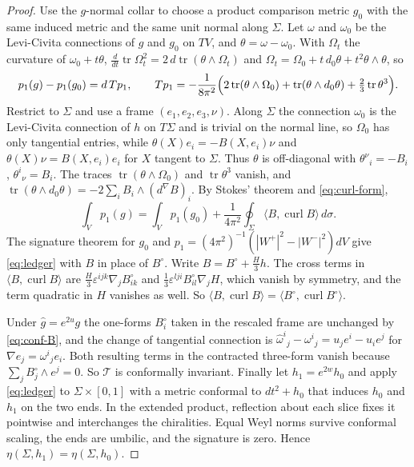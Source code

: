 \documentclass[11pt,letterpaper]{article}
\numberwithin{equation}{section}
\theoremstyle{definition}
\DeclareMathOperator{\tr}{tr}
\DeclareMathOperator{\curl}{curl}
\newcommand{\cT}{\mathcal T}
\begin{document}
\begin{proof}
Use the \(g\)-normal collar to choose a product comparison metric
\(g_0\) with the same induced metric and the same unit normal along
\(\Sigma\). Let \(\omega\) and \(\omega_0\) be the
Levi-Civita connections of \(g\) and \(g_0\) on \(TV\), and
\(\theta=\omega-\omega_0\). With \(\Omega_t\) the curvature of
\(\omega_0+t\theta\), \(\tfrac{d}{dt}\tr\Omega_t^2=2\,d\tr(\theta\wedge\Omega_t)\)
and \(\Omega_t=\Omega_0+t\,d_0\theta+t^2\theta\wedge\theta\), so
\[
 p_1(g)-p_1(g_0)=d\,Tp_1,\qquad
 Tp_1=-\frac1{8\pi^2}\Bigl(2\tr(\theta\wedge\Omega_0)
 +\tr(\theta\wedge d_0\theta)+\tfrac23\tr\theta^3\Bigr).
\]
Restrict to \(\Sigma\) and use a frame \((e_1,e_2,e_3,\nu)\). Along
\(\Sigma\) the connection \(\omega_0\) is the Levi-Civita connection of
\(h\) on \(T\Sigma\) and is trivial on the normal line, so \(\Omega_0\)
has only tangential entries, while
\(\theta(X)e_i=-B(X,e_i)\nu\) and \(\theta(X)\nu=B(X,e_i)e_i\) for
\(X\) tangent to \(\Sigma\). Thus \(\theta\) is off-diagonal with
\(\theta^\nu{}_i=-B_i\), \(\theta^i{}_\nu=B_i\). The traces
\(\tr(\theta\wedge\Omega_0)\) and \(\tr\theta^3\) vanish, and
\(\tr(\theta\wedge d_0\theta)=-2\sum_iB_i\wedge(d^\nabla B)_i\). By
Stokes' theorem and \eqref{eq:curl-form},
\[
 \int_Vp_1(g)=\int_Vp_1(g_0)+\frac1{4\pi^2}\oint_\Sigma
 \langle B,\curl B\rangle\,d\sigma .
\]
The signature theorem for \(g_0\) and \(p_1=(4\pi^2)^{-1}(|W^+|^2-|W^-|^2)dV\)
give \eqref{eq:ledger} with \(B\) in place of \(B^\circ\). Write
\(B=B^\circ+\tfrac H3h\). The cross terms in
\(\langle B,\curl B\rangle\) are \(\tfrac H3\varepsilon^{ijk}\nabla_jB^\circ_{ik}\)
and \(\tfrac13\varepsilon^{lji}B^\circ_{il}\nabla_jH\), which vanish by
symmetry, and the term quadratic in \(H\) vanishes as well. So
\(\langle B,\curl B\rangle=\langle B^\circ,\curl B^\circ\rangle\).

Under \(\hat g=e^{2u}g\) the one-forms \(B^\circ_i\) taken in the rescaled
frame are unchanged by \eqref{eq:conf-B}, and the change of tangential connection is
\(\widehat\omega^i{}_j-\omega^i{}_j=u_je^i-u_ie^j\) for
\(\nabla e_j=\omega^i{}_j e_i\). Both resulting terms in the contracted
three-form vanish because \(\sum_jB_j^\circ\wedge e^j=0\). So \(\cT\) is
conformally invariant. Finally let \(h_1=e^{2w}h_0\) and apply
\eqref{eq:ledger} to \(\Sigma\times[0,1]\) with a metric conformal to
\(dt^2+h_0\) that induces \(h_0\) and \(h_1\) on the two ends. In the extended product, reflection about each slice fixes it
pointwise and interchanges the chiralities. Equal Weyl norms survive
conformal scaling, the ends are umbilic, and the signature is zero. Hence \(\eta(\Sigma,h_1)=\eta(\Sigma,h_0)\).
\end{proof}
\end{document}
